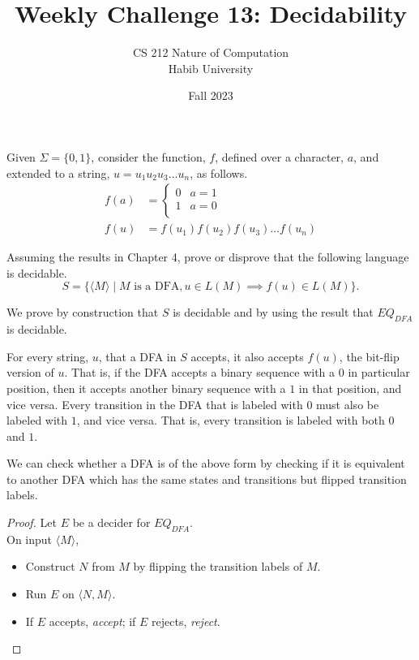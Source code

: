 \documentclass[a4paper]{exam}
\title{Weekly Challenge 13: Decidability}
\author{CS 212 Nature of Computation\\Habib University}
\date{Fall 2023}
\theoremstyle{theorem}
\theoremstyle{claim}
\begin{document}
\maketitle

\begin{questions}


  Given $\Sigma=\{0,1\}$, consider the function, $f$, defined over a character, $a$, and extended to a string, $u=u_1u_2u_3\ldots u_n$, as follows.
  \begin{align*}
    f(a) & =
           \begin{cases}
             0 & a = 1\\
             1 & a = 0\\
           \end{cases}\\
    f(u) & = f(u_1)f(u_2)f(u_3)\ldots f(u_n)
  \end{align*}

  Assuming the results in Chapter 4, prove or disprove that the following language is decidable.
\[
  S = \{\langle M\rangle \mid M\text{ is a DFA},  u\in L(M) \implies f(u)\in L(M)\}.
\]

\begin{solution}
  We prove by construction that $S$ is decidable and by using the result that $EQ_{DFA}$ is decidable.

  For every string, $u$, that a DFA in $S$ accepts, it also accepts $f(u)$, the bit-flip version of $u$. That is, if the DFA accepts a binary sequence with a $0$ in particular position, then it accepts another binary sequence with a $1$ in that position, and vice versa. Every transition in the DFA that is labeled with $0$ must also be labeled with $1$, and vice versa. That is, every transition is labeled with both $0$ and $1$.

  We can check whether a DFA is of the above form by checking if it is equivalent to another DFA which has the same states and transitions but flipped transition labels.

  \begin{proof}
    Let $E$ be a decider for $EQ_{DFA}$.\\
    On input $\langle M \rangle$,
    \begin{itemize}
    \item Construct $N$ from $M$ by flipping the transition labels of $M$.

    \item Run $E$ on $\langle N, M\rangle$.
    \item If $E$ accepts, \textit{accept}; if $E$ rejects, \textit{reject}.
    \end{itemize}
  \end{proof}
\end{solution}

\end{questions}
\end{document}
